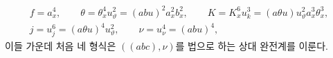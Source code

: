 
\[
\begin{gathered}
f=a_x^4,\qquad
\theta=\theta_x^4u_\vartheta^2=(abu)^2a_x^2b_x^2,
\qquad
K=K_x^6u_k^3=(a\theta u)u_\vartheta^2a_x^3\theta_x^3,\\
j=u_j^6=(a\theta u)^4u_\vartheta^2,\qquad
\nu=u_\nu^4=(abu)^4,
\end{gathered}
\]
이들 가운데 처음 네 형식은 $((abc),\nu)$를 법으로 하는 상대 완전계를 이룬다.

